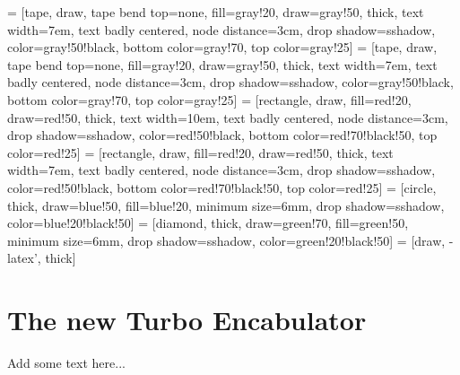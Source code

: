 

 = [tape, draw, tape bend top=none, fill=gray!20, draw=gray!50, thick, 
    text width=7em, text badly centered, node distance=3cm, drop shadow={sshadow, color=gray!50!black},
    bottom color=gray!70, top color=gray!25]
 = [tape, draw, tape bend top=none, fill=gray!20, draw=gray!50, thick,
    text width=7em, text badly centered, node distance=3cm, drop shadow={sshadow, color=gray!50!black},
    bottom color=gray!70, top color=gray!25]
 = [rectangle, draw, fill=red!20, draw=red!50, thick,
    text width=10em, text badly centered, node distance=3cm, drop shadow={sshadow, color=red!50!black},
    bottom color=red!70!black!50, top color=red!25]
 = [rectangle, draw, fill=red!20, draw=red!50, thick,
    text width=7em, text badly centered, node distance=3cm, drop shadow={sshadow, color=red!50!black},
    bottom color=red!70!black!50, top color=red!25]
 = [circle, thick, draw=blue!50, fill=blue!20, minimum size=6mm,
    drop shadow={sshadow, color=blue!20!black!50}]
 = [diamond, thick, draw=green!70, fill=green!50, minimum size=6mm,
    drop shadow={sshadow, color=green!20!black!50}]
 = [draw, -latex', thick]

\chapter{The new Turbo Encabulator}
\label{sec:woot}
Add some text here...
